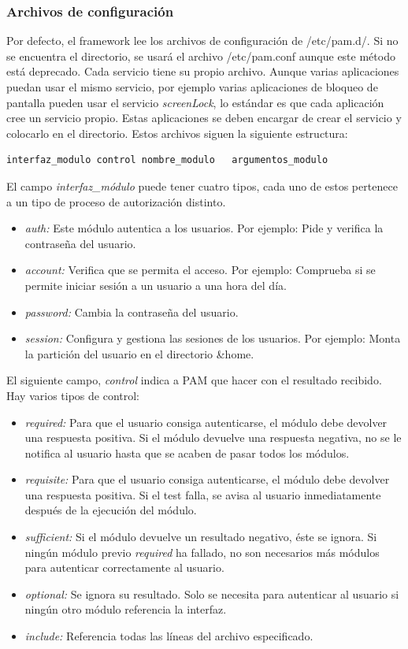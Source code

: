 \documentclass[titlepage, 12pt, a4paper]{article}
\begin{document}
\subsubsection{Archivos de configuración}
Por defecto, el framework lee los archivos de configuración de /etc/pam.d/. Si no se encuentra el directorio, se usará el archivo /etc/pam.conf aunque este método está deprecado. Cada servicio tiene su propio archivo. Aunque varias aplicaciones puedan usar el mismo servicio, por ejemplo varias aplicaciones de bloqueo de pantalla pueden usar el servicio \textit{screenLock}, lo estándar es que cada aplicación cree un servicio propio. Estas aplicaciones se deben encargar de crear el servicio y colocarlo en el directorio.
Estos archivos siguen la siguiente estructura:
\begin{lstlisting}
interfaz_modulo	control	nombre_modulo	argumentos_modulo
\end{lstlisting} \par
El campo \textit{interfaz\_módulo} puede tener cuatro tipos, cada uno de estos pertenece a un tipo de proceso de autorización distinto.
\begin{itemize}
	\item{\textit{auth: }}Este módulo autentica a los usuarios. Por ejemplo: Pide y verifica la contraseña del usuario.
	\item{\textit{account: }}Verifica que se permita el acceso. Por ejemplo: Comprueba si se permite iniciar sesión a un usuario a una hora del día.
	\item{\textit{password: }}Cambia la contraseña del usuario.
	\item{\textit{session: }}Configura y gestiona las sesiones de los usuarios. Por ejemplo: Monta la partición del usuario en el directorio \&home.
\end{itemize} \par
El siguiente campo, \textit{control} indica a PAM que hacer con el resultado recibido. Hay varios tipos de control:
\begin{itemize}
	\item{\textit{required: }}Para que el usuario consiga autenticarse, el módulo debe devolver una respuesta positiva. Si el módulo devuelve una respuesta negativa, no se le notifica al usuario hasta que se acaben de pasar todos los módulos.
	\item{\textit{requisite: }}Para que el usuario consiga autenticarse, el módulo debe devolver una respuesta positiva. Si el test falla, se avisa al usuario inmediatamente después de la ejecución del módulo.
	\item{\textit{sufficient: }}Si el módulo devuelve un resultado negativo, éste se ignora. Si ningún módulo previo \textit{required} ha fallado, no son necesarios más módulos para autenticar correctamente al usuario.
	\item{\textit{optional: }}Se ignora su resultado. Solo se necesita para autenticar al usuario si ningún otro módulo referencia la interfaz.
	\item{\textit{include: }}Referencia todas las líneas del archivo especificado.
\end{itemize} \par
\end{document}
